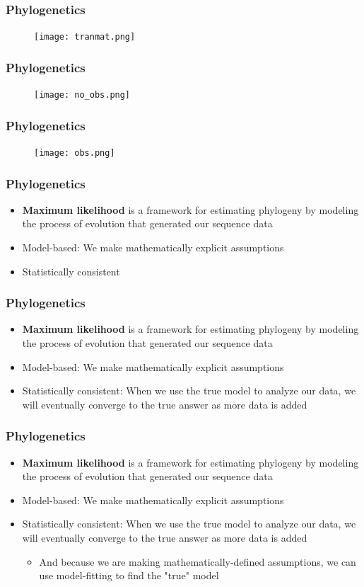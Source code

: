 \documentclass{beamer}
\begin{document}
\begin{frame}
\frametitle{Phylogenetics}
\begin{figure}
    \texttt{[image: tranmat.png]}
    \end{figure}
\end{frame} 

\begin{frame}
\frametitle{Phylogenetics}
\begin{figure}
    \texttt{[image: no\_obs.png]}
    \end{figure}
\end{frame} 

\begin{frame}
\frametitle{Phylogenetics}
\begin{figure}
    \texttt{[image: obs.png]}
    \end{figure}
\end{frame} 

\begin{frame}
\frametitle{Phylogenetics}
\begin{itemize}
\item \textbf{Maximum likelihood} is a framework for estimating phylogeny by modeling the process of evolution that generated our sequence data
\item Model-based: We make mathematically explicit assumptions 
\item Statistically consistent
\end{itemize}
\end{frame}

\begin{frame}
\frametitle{Phylogenetics}
\begin{itemize}
\item \textbf{Maximum likelihood} is a framework for estimating phylogeny by modeling the process of evolution that generated our sequence data
\item Model-based: We make mathematically explicit assumptions 
\item Statistically consistent: When we use the true model to analyze our data, we will eventually converge to the true answer as more data is added
\end{itemize}
\end{frame}

\begin{frame}
\frametitle{Phylogenetics}
\begin{itemize}
\item \textbf{Maximum likelihood} is a framework for estimating phylogeny by modeling the process of evolution that generated our sequence data
\item Model-based: We make mathematically explicit assumptions 
\item Statistically consistent: When we use the true model to analyze our data, we will eventually converge to the true answer as more data is added
\begin{itemize}
\item And because we are making mathematically-defined assumptions, we can use model-fitting to find the "true" model
\end{itemize}
\end{itemize}
\end{frame}
\end{document}
